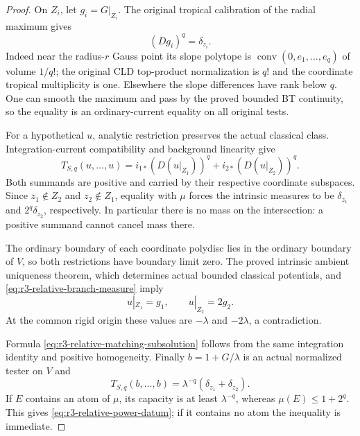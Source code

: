 \documentclass[11pt,a4paper]{article}
\numberwithin{equation}{section}
\theoremstyle{definition}
\theoremstyle{remark}
\begin{document}
\begin{proof}
On $Z_i$, let $g_i=G|_{Z_i}$. The original tropical calibration of
the radial maximum gives
\begin{equation}
 (Dg_i)^q=\delta_{z_i}.
 \label{eq:r3-relative-branch-measure}
\end{equation}
Indeed near the radius-$r$ Gauss point its slope polytope is
$\operatorname{conv}(0,e_1,\ldots,e_q)$ of volume $1/q!$;
the original CLD top-product normalization is $q!$ and the
coordinate tropical multiplicity is one. Elsewhere the slope
differences have rank below $q$. One can smooth the maximum and
pass by the proved bounded BT continuity, so the equality is an
ordinary-current equality on all original tests.

For a hypothetical $u$, analytic restriction preserves the actual
classical class. Integration-current compatibility and background
linearity give
\begin{equation}
 T_{S,q}(u,\ldots,u)
 =i_{1*}(D(u|_{Z_1}))^q+i_{2*}(D(u|_{Z_2}))^q .
 \label{eq:r3-relative-axis-splitting}
\end{equation}
Both summands are positive and carried by their respective
coordinate subspaces. Since $z_1\notin Z_2$ and $z_2\notin Z_1$,
equality with $\mu$ forces the intrinsic measures to be
$\delta_{z_1}$ and $2^q\delta_{z_2}$, respectively. In particular
there is no mass on the intersection: a positive summand cannot
cancel mass there.

The ordinary boundary of each coordinate polydisc lies in the
ordinary boundary of $V$, so both restrictions have boundary
limit zero. The proved intrinsic ambient uniqueness theorem,
which determines actual bounded classical potentials, and
\eqref{eq:r3-relative-branch-measure} imply
\[
 u|_{Z_1}=g_1,\qquad u|_{Z_2}=2g_2 .
\]
At the common rigid origin these values are $-\lambda$ and
$-2\lambda$, a contradiction.

Formula \eqref{eq:r3-relative-matching-subsolution} follows from
the same integration identity and positive homogeneity. Finally
$b=1+G/\lambda$ is an actual normalized tester on $V$ and
\[
 T_{S,q}(b,\ldots,b)
           =\lambda^{-q}(\delta_{z_1}+\delta_{z_2}).
\]
If $E$ contains an atom of $\mu$, its capacity is at least
$\lambda^{-q}$, whereas $\mu(E)\leq1+2^q$. This gives
\eqref{eq:r3-relative-power-datum}; if it contains no atom the
inequality is immediate.
\end{proof}
\end{document}
